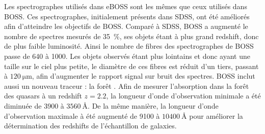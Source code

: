 Les spectrographes utilisés dans eBOSS sont les mêmes que ceux utilisés dans BOSS. Ces spectrographes, initialement présents dans SDSS, ont été améliorés afin d'atteindre les objectifs de BOSS. Comparé à SDSS, BOSS a augmenté le nombre de spectres mesurés de \SI{35}{\percent}, ses objets étant à plus grand redshift, donc de plus faible luminosité. Ainsi le nombre de fibres des spectrographes de BOSS passe de \num{640} à \num{1000}. Les objets observés étant plus lointains et donc ayant une taille sur le ciel plus petite, le diamètre de ces fibres est réduit d'un tiers, passant à $\SI{120}{\micro\meter}$, afin d'augmenter le rapport signal sur bruit des spectres. BOSS inclut aussi un nouveau traceur : la forêt \lya{}. Afin de mesurer l'absorption dans la forêt \lya{} des quasars à un redshift $z=\num{2,2}$, la longueur d'onde d'observation minimale a été diminuée de \num{3900} à $\SI{3560}{\angstrom}$. De la même manière, la longueur d'onde d'observation maximale à été augmenté de \num{9100} à $\SI{10400}{\angstrom}$ pour améliorer la détermination des redshifts de l'échantillon de galaxies.

